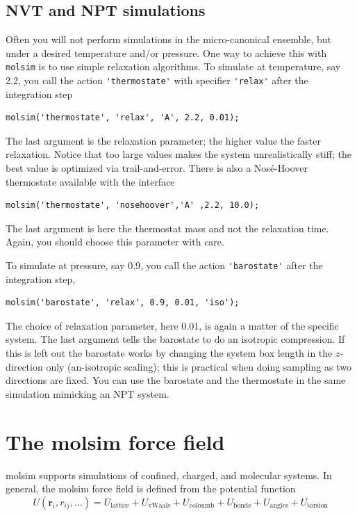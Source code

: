 \documentclass[11pt]{article}
\begin{document}
\subsection{NVT and NPT simulations}
Often you will not perform simulations in the micro-canonical ensemble, but under
a desired temperature and/or pressure. One way to achieve this with
\verb!molsim! is to use simple relaxation algorithms. To simulate at
temperature, say 2.2, you call the action \verb!'thermostate'! with specifier
\verb!'relax'! after the integration step
\begin{verbatim}
molsim('thermostate', 'relax', 'A', 2.2, 0.01);
\end{verbatim}
The last argument is the relaxation parameter; the higher value the faster
relaxation. Notice that too large values makes the system unrealistically
stiff; the best value is optimized via trail-and-error. There is also a
Nos\'{e}-Hoover thermostate available with the interface
\begin{verbatim}
molsim('thermostate', 'nosehoover','A' ,2.2, 10.0);
\end{verbatim}
The last argument is here the thermostat mass and not the relaxation
time. Again, you should choose this parameter with care.

To simulate at pressure, say 0.9, you call the action \verb!'barostate'! after
the integration step,
\begin{verbatim}
molsim('barostate', 'relax', 0.9, 0.01, 'iso');
\end{verbatim}
The choice of relaxation parameter, here 0.01, is again a matter of the specific
system. The last argument tells the barostate to do an isotropic compression. If
this is left out the barostate works by changing the system box length in the
$z$-direction only (an-isotropic scaling); this is practical when doing sampling
as two directions are fixed. You can use the barostate and the thermostate
in the same simulation mimicking an NPT system.


\section{The \textsf{molsim} force field}
\textsf{molsim} supports simulations of confined, charged, and molecular
systems. In general, the \textsf{molsim} force field is defined from the
potential function
\begin{equation}
  U(\mathbf{r}_i, r_{ij}, \ldots)
  =  U_\mathrm{lattice} + U_\mathrm{vWaals} + U_{\mathrm{coloumb}} +
  U_\mathrm{bonds} + U_\mathrm{angles} + 
  U_\mathrm{torsion}
\end{equation}
\end{document}
